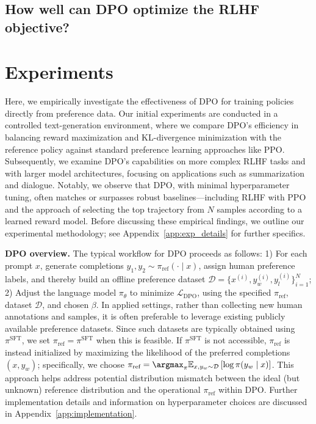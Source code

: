 \subsection{How well can DPO optimize the RLHF objective?}

\section{Experiments}
Here, we empirically investigate the effectiveness of DPO for training policies directly from preference data. Our initial experiments are conducted in a controlled text-generation environment, where we compare DPO's efficiency in balancing reward maximization and KL-divergence minimization with the reference policy against standard preference learning approaches like PPO. Subsequently, we examine DPO's capabilities on more complex RLHF tasks and with larger model architectures, focusing on applications such as summarization and dialogue. Notably, we observe that DPO, with minimal hyperparameter tuning, often matches or surpasses robust baselines—including RLHF with PPO and the approach of selecting the top trajectory from $N$ samples according to a learned reward model. Before discussing these empirical findings, we outline our experimental methodology; see Appendix~\ref{app:exp_details} for further specifics.

\textbf{DPO overview.} The typical workflow for DPO proceeds as follows: 1) For each prompt $x$, generate completions $y_1, y_2 \sim \pi_\text{ref}(\cdot \mid x)$, assign human preference labels, and thereby build an offline preference dataset $\mathcal{D} = \{x^{(i)}, y_w^{(i)}, y_l^{(i)}\}_{i=1}^N$; 2) Adjust the language model $\pi_\theta$ to minimize $\mathcal{L}_\text{DPO}$, using the specified $\pi_\text{ref}$, dataset $\mathcal{D}$, and chosen $\beta$. 
In applied settings, rather than collecting new human annotations and samples, it is often preferable to leverage existing publicly available preference datasets. Since such datasets are typically obtained using $\pi^\text{SFT}$, we set $\pi_\text{ref} = \pi^\text{SFT}$ when this is feasible. If $\pi^\text{SFT}$ is not accessible, $\pi_\text{ref}$ is instead initialized by maximizing the likelihood of the preferred completions $(x, y_w)$; specifically, we choose ${\pi_\text{ref} = \argmax_{\pi}\mathbb{E}_{x, y_w \sim \mathcal{D}}\left[\log \pi(y_w \mid x)\right]}$. This approach helps address potential distribution mismatch between the ideal (but unknown) reference distribution and the operational $\pi_\text{ref}$ within DPO. Further implementation details and information on hyperparameter choices are discussed in Appendix~\ref{app:implementation}.

